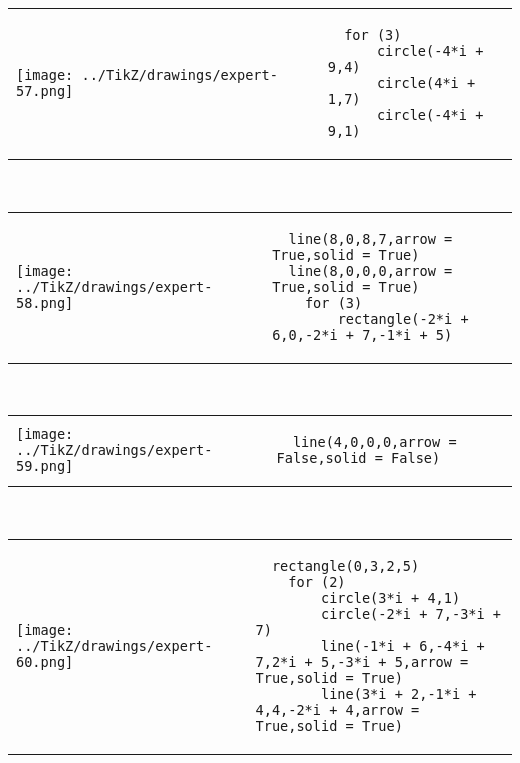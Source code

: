             \begin{tabular}{ll}
    \texttt{[image: ../TikZ/drawings/expert-57.png]}&
    
        \begin{minipage}{10cm}
        \begin{verbatim}
  for (3)
      circle(-4*i + 9,4)
      circle(4*i + 1,7)
      circle(-4*i + 9,1)
        \end{verbatim}
\end{minipage}

    \end{tabular}        
            \\

            \begin{tabular}{ll}
    \texttt{[image: ../TikZ/drawings/expert-58.png]}&
    
        \begin{minipage}{10cm}
        \begin{verbatim}
  line(8,0,8,7,arrow = True,solid = True)
  line(8,0,0,0,arrow = True,solid = True)
    for (3)
        rectangle(-2*i + 6,0,-2*i + 7,-1*i + 5)
        \end{verbatim}
\end{minipage}

    \end{tabular}        
            \\

            \begin{tabular}{ll}
    \texttt{[image: ../TikZ/drawings/expert-59.png]}&
    
        \begin{minipage}{10cm}
        \begin{verbatim}
  line(4,0,0,0,arrow = False,solid = False)
        \end{verbatim}
\end{minipage}

    \end{tabular}        
            \\

            \begin{tabular}{ll}
    \texttt{[image: ../TikZ/drawings/expert-60.png]}&
    
        \begin{minipage}{10cm}
        \begin{verbatim}
  rectangle(0,3,2,5)
    for (2)
        circle(3*i + 4,1)
        circle(-2*i + 7,-3*i + 7)
        line(-1*i + 6,-4*i + 7,2*i + 5,-3*i + 5,arrow = True,solid = True)
        line(3*i + 2,-1*i + 4,4,-2*i + 4,arrow = True,solid = True)
        \end{verbatim}
\end{minipage}

    \end{tabular}        
            \\


